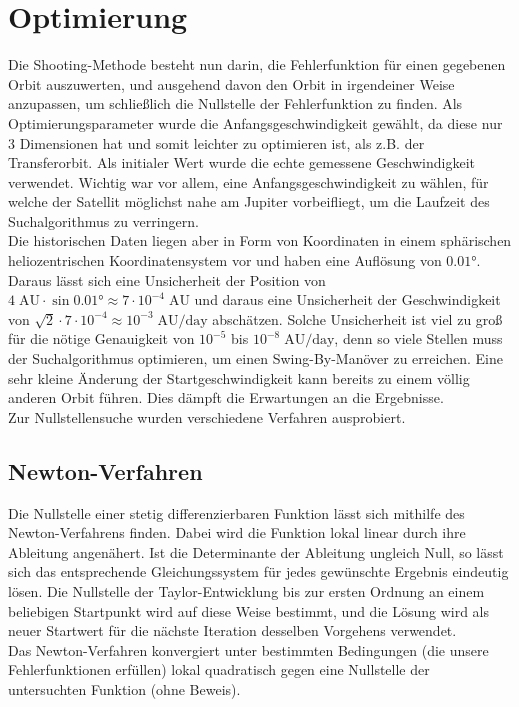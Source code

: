\section{Optimierung}
Die Shooting-Methode besteht nun darin, die Fehlerfunktion für einen gegebenen Orbit auszuwerten, und ausgehend davon den Orbit in irgendeiner Weise anzupassen, um schließlich die Nullstelle der Fehlerfunktion zu finden.
Als Optimierungsparameter wurde die Anfangsgeschwindigkeit gewählt, da diese nur 3 Dimensionen hat und somit leichter zu optimieren ist, als z.B. der Transferorbit.
Als initialer Wert wurde die echte gemessene Geschwindigkeit verwendet. Wichtig war vor allem, eine Anfangsgeschwindigkeit zu wählen, für welche der Satellit möglichst nahe am Jupiter vorbeifliegt, um die Laufzeit des Suchalgorithmus zu verringern. \\
Die historischen Daten liegen aber in Form von Koordinaten in einem sphärischen heliozentrischen Koordinatensystem vor und haben eine Auflösung von $0.01\text{°}$.
Daraus lässt sich eine Unsicherheit der Position von $4\;\text{AU}\cdot\sin 0.01\text{°}\approx 7\cdot 10^{-4}\;\text{AU}$ und daraus eine Unsicherheit der Geschwindigkeit von $\sqrt{2}\cdot 7\cdot 10^{-4} \approx 10^{-3}\;\text{AU/day}$ abschätzen.
Solche Unsicherheit ist viel zu groß für die nötige Genauigkeit von $10^{-5}$ bis $10^{-8}\;\text{AU/day}$, denn so viele Stellen muss der Suchalgorithmus optimieren, um einen Swing-By-Manöver zu erreichen. Eine sehr kleine Änderung der Startgeschwindigkeit kann bereits zu einem völlig anderen Orbit führen. Dies dämpft die Erwartungen an die Ergebnisse.\\
Zur Nullstellensuche wurden verschiedene Verfahren ausprobiert.

\subsection{Newton-Verfahren}

Die Nullstelle einer stetig differenzierbaren Funktion lässt sich mithilfe des Newton-Verfahrens finden. Dabei wird die Funktion lokal linear durch ihre Ableitung angenähert. Ist die Determinante der Ableitung ungleich Null, so lässt sich das entsprechende Gleichungssystem für jedes gewünschte Ergebnis eindeutig lösen. Die Nullstelle der Taylor-Entwicklung bis zur ersten Ordnung an einem beliebigen Startpunkt wird auf diese Weise bestimmt, und die Lösung wird als neuer Startwert für die nächste Iteration desselben Vorgehens verwendet. \\
Das Newton-Verfahren konvergiert unter bestimmten Bedingungen (die unsere Fehlerfunktionen erfüllen) lokal quadratisch gegen eine Nullstelle der untersuchten Funktion (ohne Beweis).

